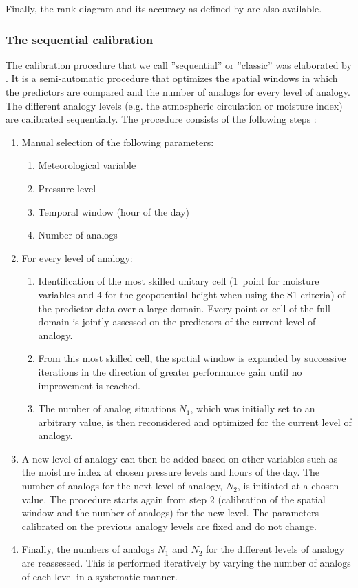 \documentclass[review]{elsarticle}
\begin{document}
Finally, the rank diagram \citep{Talagrand1997} and its accuracy as defined by \citet{Candille2005} are also available.


\subsubsection{The sequential calibration}
\label{sec:sequential}

The calibration procedure that we call ''sequential'' or ''classic'' was elaborated by \citet{Bontron2004} \cite[see also][]{Radanovics2013, BenDaoud2016}. It is a semi-automatic procedure that optimizes the spatial windows in which the predictors are compared and the number of analogs for every level of analogy. The different analogy levels (e.g. the atmospheric circulation or moisture index) are calibrated sequentially. The procedure consists of the following steps \citep{Bontron2004}:

\begin{enumerate}
	\item Manual selection of the following parameters:
	\begin{enumerate}
		\item Meteorological variable
		\item Pressure level
		\item Temporal window (hour of the day)
		\item Number of analogs 
	\end{enumerate}
	
	\item For every level of analogy:
	\begin{enumerate}
		\item Identification of the most skilled unitary cell (1~point for moisture variables and 4 for the geopotential height when using the S1 criteria) of the predictor data over a large domain. Every point or cell of the full domain is jointly assessed on the predictors of the current level of analogy.
		\item From this most skilled cell, the spatial window is expanded by successive iterations in the direction of greater performance gain until no improvement is reached.
		\item The number of analog situations $N_{1}$, which was initially set to an arbitrary value, is then reconsidered and optimized for the current level of analogy.
	\end{enumerate}
	\item A new level of analogy can then be added based on other variables such as the moisture index at chosen pressure levels and hours of the day. The number of analogs for the next level of analogy, $N_{2}$, is initiated at a chosen value. The procedure starts again from step 2 (calibration of the spatial window and the number of analogs) for the new level. The parameters calibrated on the previous analogy levels are fixed and do not change.
	\item Finally, the numbers of analogs $N_{1}$ and $N_{2}$ for the different levels of analogy are reassessed. This is performed iteratively by varying the number of analogs of each level in a systematic manner. 
\end{enumerate}
\end{document}
